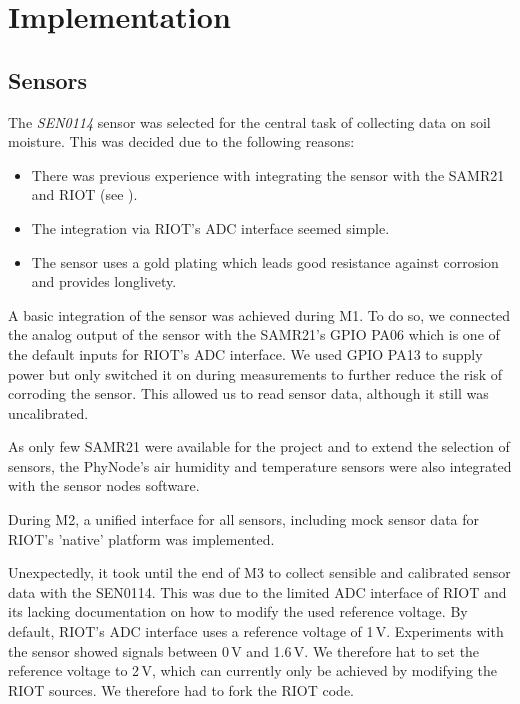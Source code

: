 \documentclass[11pt,paper=a4,parskip=half]{scrartcl}
\begin{document}
\section{Implementation}

\subsection{Sensors}
\label{sec:sensors}
  The \textit{SEN0114} \cite{SEN} sensor was selected for the central task of collecting
  data on soil moisture. This was decided due to the following reasons:

  \begin{itemize}
    \item There was previous experience with integrating the sensor with the
	    SAMR21 and RIOT (see \cite{watrli}).
    \item The integration via RIOT's ADC interface \cite{riot_adc} seemed
	    simple.
    \item The sensor uses a gold plating which leads good resistance against
	    corrosion and provides longlivety.
  \end{itemize}

  A basic integration of the sensor was achieved during M1. To do so, we
  connected the analog output of the sensor with the SAMR21's GPIO PA06 which
  is one of the default inputs for RIOT's ADC interface. We used GPIO PA13 to
  supply power but only switched it on during measurements to further reduce
  the risk of corroding the sensor. This allowed us to read sensor data,
  although it still was uncalibrated.

  As only few SAMR21 were available for the project and to extend the selection
  of sensors, the PhyNode's air humidity and temperature sensors were also
  integrated with the sensor nodes software.

  During M2, a unified interface for all sensors, including mock sensor data
  for RIOT's 'native' platform was implemented.

  Unexpectedly, it took until the end of M3 to collect sensible and calibrated
  sensor data with the SEN0114. This was due to the limited ADC interface of
  RIOT and its lacking documentation on how to modify the used reference
  voltage. By default, RIOT's ADC interface uses a reference voltage of 1\,V.
  Experiments with the sensor showed signals between 0\,V and 1.6\,V. We therefore
  hat to set the reference voltage to 2\,V, which can currently only be achieved
  by modifying the RIOT sources. We therefore had to fork the RIOT code.
\end{document}
